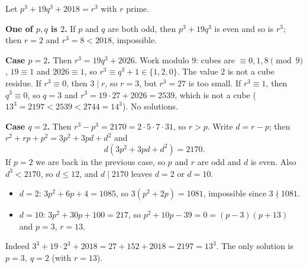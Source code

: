 Let $p^3+19q^3+2018=r^3$ with $r$ prime.

\textbf{One of $p,q$ is $2$.} If $p$ and $q$ are both odd, then $p^3+19q^3$ is even and so is $r^3$; then $r=2$ and $r^3=8<2018$, impossible.

\textbf{Case $p=2$.} Then $r^3=19q^3+2026$. Work modulo $9$: cubes are $\equiv0,1,8\pmod9$, $19\equiv1$ and $2026\equiv1$, so $r^3\equiv q^3+1\in\{1,2,0\}$. The value $2$ is not a cube residue. If $r^3\equiv0$, then $3\mid r$, so $r=3$, but $r^3=27$ is too small. If $r^3\equiv1$, then $q^3\equiv0$, so $q=3$ and $r^3=19\cdot27+2026=2539$, which is not a cube ($13^3=2197<2539<2744=14^3$). No solutions.

\textbf{Case $q=2$.} Then $r^3-p^3=2170=2\cdot5\cdot7\cdot31$, so $r>p$. Write $d=r-p$; then $r^2+rp+p^2=3p^2+3pd+d^2$ and
\[
d\left(3p^2+3pd+d^2\right)=2170 .
\]
If $p=2$ we are back in the previous case, so $p$ and $r$ are odd and $d$ is even. Also $d^3<2170$, so $d\le12$, and $d\mid2170$ leaves $d=2$ or $d=10$.
\begin{itemize}
\item $d=2$: $3p^2+6p+4=1085$, so $3\left(p^2+2p\right)=1081$, impossible since $3\nmid1081$.
\item $d=10$: $3p^2+30p+100=217$, so $p^2+10p-39=0=(p-3)(p+13)$ and $p=3$, $r=13$.
\end{itemize}
Indeed $3^3+19\cdot2^3+2018=27+152+2018=2197=13^3$. The only solution is $\boxed{p=3,\ q=2}$ (with $r=13$).
